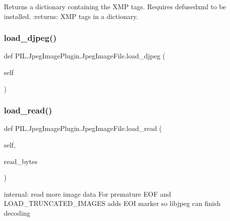 \begin{DoxyVerb}Returns a dictionary containing the XMP tags.
Requires defusedxml to be installed.
:returns: XMP tags in a dictionary.
\end{DoxyVerb}
 \mbox{\label{classPIL_1_1JpegImagePlugin_1_1JpegImageFile_afd1b1d89878a5caf762ff2afca947181}} 
\subsubsection{\texorpdfstring{load\+\_\+djpeg()}{load\_djpeg()}}
{\footnotesize\ttfamily def P\+I\+L.\+Jpeg\+Image\+Plugin.\+Jpeg\+Image\+File.\+load\+\_\+djpeg (\begin{DoxyParamCaption}\item[{}]{self }\end{DoxyParamCaption})}

\mbox{\label{classPIL_1_1JpegImagePlugin_1_1JpegImageFile_adf274a543acdd38d6a9cb8accb64c9a3}} 
\subsubsection{\texorpdfstring{load\+\_\+read()}{load\_read()}}
{\footnotesize\ttfamily def P\+I\+L.\+Jpeg\+Image\+Plugin.\+Jpeg\+Image\+File.\+load\+\_\+read (\begin{DoxyParamCaption}\item[{}]{self,  }\item[{}]{read\+\_\+bytes }\end{DoxyParamCaption})}

\begin{DoxyVerb}internal: read more image data
For premature EOF and LOAD_TRUNCATED_IMAGES adds EOI marker
so libjpeg can finish decoding
\end{DoxyVerb}
 

